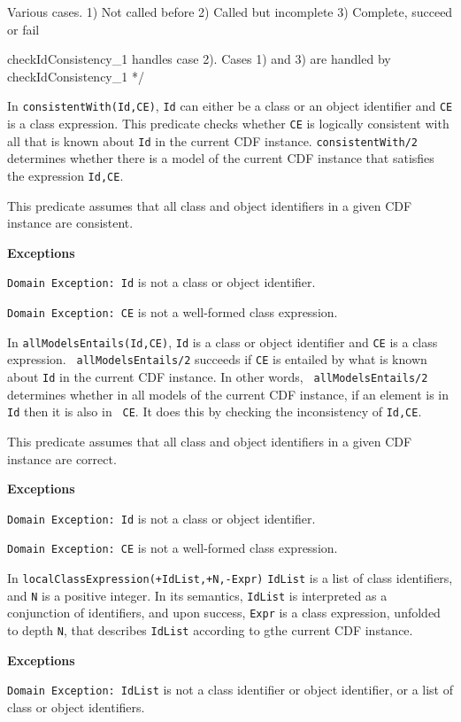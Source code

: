 \begin{description}
{Various cases.  
1) Not called before 
2) Called but incomplete 
3) Complete, succeed or fail 

checkIdConsistency_1 handles case 2).  
Cases 1) and 3) are handled by checkIdConsistency_1
*/
}
In {\tt consistentWith(Id,CE)}, {\tt Id} can either be a class or an
object identifier and {\tt CE} is a class expression.  This predicate
checks whether {\tt CE} is logically consistent with all that is known
about {\tt Id} in the current CDF instance.  {\tt consistentWith/2}
determines whether there is a model of the current CDF instance that
satisfies the expression {\tt Id,CE}.

This predicate assumes that all class and object identifiers in a
given CDF instance are consistent.

{\bf Exceptions} 

{\tt Domain Exception: Id} is not a class or object identifier.

{\tt Domain Exception: CE} is not a well-formed class expression.

In {\tt allModelsEntails(Id,CE)}, {\tt Id} is a class or object
identifier and {\tt CE} is a class expression. {\tt
allModelsEntails/2} succeeds if {\tt CE} is entailed by what is known
about {\tt Id} in the current CDF instance.  In other words, {\tt
allModelsEntails/2} determines whether in all models of the current
CDF instance, if an element is in {\tt Id} then it is also in {\tt
CE}.  It does this by checking the inconsistency of {\tt Id,CE}.

This predicate assumes that all class and object identifiers in a
given CDF instance are correct.

{\bf Exceptions} 

{\tt Domain Exception: Id} is not a class or object identifier.

{\tt Domain Exception: CE} is not a well-formed class expression.

In {\tt localClassExpression(+IdList,+N,-Expr)} {\tt IdList} is a list
of class identifiers, and {\tt N} is a positive integer.  In its
semantics, {\tt IdList} is interpreted as a conjunction of
identifiers, and upon success, {\tt Expr} is a class expression,
unfolded to depth {\tt N}, that describes {\tt IdList} according to
gthe current CDF instance.

{\bf Exceptions} 

{\tt Domain Exception: IdList} is not a class identifier or object
identifier, or a list of class or object identifiers.


\end{description}
